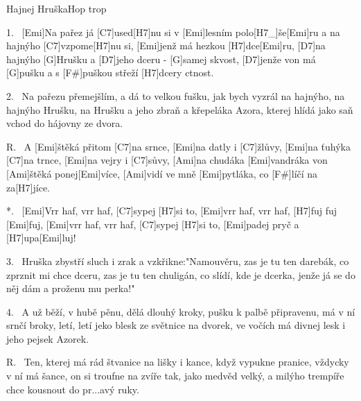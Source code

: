 \begin{song}{Hajnej Hruška}{Hop trop}

\begin{xverse}{1.~}
[Emi]Na pařez já [C7]used[H7]nu si v [Emi]lesním polo[H7_]{še}[Emi]{ru}
a na hajnýho [C7]vzpome[H7]nu si, [Emi]jenž má hezkou [H7]dce[Emi]ru,
[D7]na hajnýho [G]Hrušku a [D7]jeho dceru - [G]samej skvost,
[D7]jenže von má [G]pušku a s [F#]puškou střeží [H7]dcery ctnost.
\end{xverse}

\begin{xverse}{2.~}
Na pařezu přemejšlím, a dá to velkou fušku,
jak bych vyzrál na hajnýho, na hajnýho Hrušku,
na Hrušku a jeho zbraň a křepeláka Azora,
kterej hlídá jako saň vchod do hájovny ze dvora.
\end{xverse}

\begin{xverse}{R.~}
A [Emi]{ště}ká přitom [C7]na srnce, [Emi]na datly i [C7]{žlů}vy,
[Emi]na ťuhýka [C7]na trnce, [Emi]na vejry i [C7]sůvy,
[Ami]na chudáka [Emi]vandráka von [Ami]{ště}ká ponej[Emi]více,
[Ami]vidí ve mně [Emi]pytláka, co [F#]líčí na za[H7]jíce.
\end{xverse}

\begin{xverse}{*.~}
[Emi]Vrr haf, vrr haf, [C7]sypej [H7]si to, [Emi]vrr haf, vrr haf, [H7]fuj fuj [Emi]fuj,
[Emi]vrr haf, vrr haf, [C7]sypej [H7]si to, [Emi]padej pryč a [H7]upa[Emi]luj!
\end{xverse}

\begin{xverse}{3.~}
Hruška zbystří sluch i zrak a vzkřikne:"Namouvěru,
zas je tu ten darebák, co zprznit mi chce dceru,
zas je tu ten chuligán, co slídí, kde je dcerka,
jenže já se do něj dám a proženu mu perka!"
\end{xverse}

\begin{xverse}{4.~}
A už běží, v hubě pěnu, dělá dlouhý kroky,
pušku k palbě připravenu, má v ní srnčí broky,
letí, letí jeko blesk ze světnice na dvorek,
ve vočích má divnej lesk i jeho pejsek Azorek.
\end{xverse}

\begin{xverse}{R.~}
Ten, kterej má rád štvanice na lišky i kance,
když vypukne pranice, vždycky v ní má šance,
on si troufne na zvíře tak, jako medvěd velký,
a milýho trempíře chce kousnout do pr...avý ruky.
\end{xverse}


\end{song}
